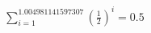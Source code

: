 \documentclass[preview]{standalone}
\begin{document}
\begin{align*}
\sum_{i=1}^{1.004981141597307} (\frac{1}{2})^i = {0.5}
\end{align*}
\end{document}
